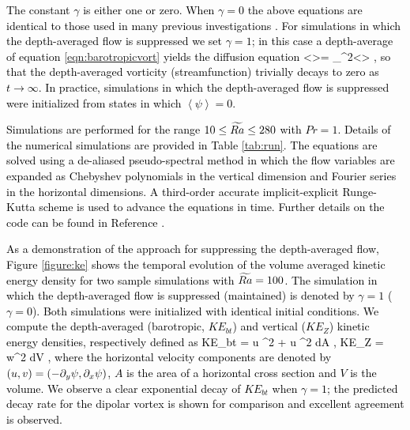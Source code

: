 	\textcolor{black}{ 
		The constant $\gamma$ is either one or zero. When $\gamma = 0$ the above equations are identical to those used in many previous investigations \citep[e.g.][]{sM21}. For simulations in which the depth-averaged flow is suppressed we set $\gamma = 1$; in this case a depth-average of equation \eqref{eqn:barotropicvort} yields the diffusion equation
\be
\dst \left<\zeta\right>= \nabla_{\perp}^{2}\left<\zeta\right> ,
\ee
so that the depth-averaged vorticity (streamfunction) trivially decays to zero as $t \rightarrow \infty$. In practice, simulations in which the depth-averaged flow is suppressed were initialized from states in which  $\left<\psi\right> = 0$.}









\textcolor{black}{
Simulations are performed for the range $10 \le \widetilde{Ra} \le 280$ with $Pr=1$.
Details of the numerical simulations are provided in Table \ref{tab:run}. The equations are solved using a de-aliased pseudo-spectral method in which the flow variables are expanded as Chebyshev polynomials in the vertical dimension and Fourier series in the horizontal dimensions. A third-order accurate implicit-explicit Runge-Kutta scheme is used to advance the equations in time. Further details on the code can be found in Reference \citep{pM16}.
}

\textcolor{black}{As a demonstration of the approach for suppressing the depth-averaged flow, Figure \ref{figure:ke} shows the temporal evolution of the volume averaged kinetic energy density for two sample simulations with $\widetilde{Ra}=100$. The simulation in which the depth-averaged flow is suppressed (maintained) is denoted by $\gamma=1$ ($\gamma=0$). Both simulations were initialized with identical initial conditions. We compute the depth-averaged (barotropic, $KE_{bt}$) and vertical ($KE_Z$) kinetic energy densities, respectively defined as
\be
KE_{bt} =  \int \ls \langle u \rangle^2 + \langle u \rangle^2 \rs dA , \qquad
KE_{Z} =  \int w^2 dV ,
\ee
where the horizontal velocity components are denoted by $(u,v) = \left ( - {\partial_y} \psi, {\partial_x} \psi \right )$, $A$ is the area of a horizontal cross section and $V$ is the volume.
We observe a clear exponential decay of $KE_{bt}$ when $\gamma=1$; the predicted decay rate for the dipolar vortex is shown for comparison and excellent agreement is observed.}

